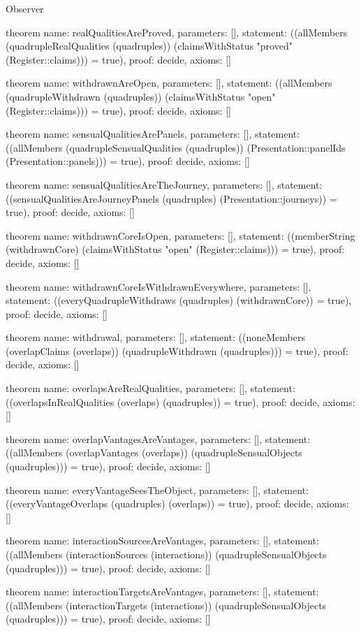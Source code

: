 \begin{lexlean}{Observer}
\begin{semanticmodule}
theorem{
  name: realQualitiesAreProved,
  parameters: [],
  statement: ((allMembers (quadrupleRealQualities (quadruples)) (claimsWithStatus "proved" (Register::claims))) = true),
  proof: decide{},
  axioms: []
}

theorem{
  name: withdrawnAreOpen,
  parameters: [],
  statement: ((allMembers (quadrupleWithdrawn (quadruples)) (claimsWithStatus "open" (Register::claims))) = true),
  proof: decide{},
  axioms: []
}

theorem{
  name: sensualQualitiesArePanels,
  parameters: [],
  statement: ((allMembers (quadrupleSensualQualities (quadruples)) (Presentation::panelIds (Presentation::panels))) = true),
  proof: decide{},
  axioms: []
}

theorem{
  name: sensualQualitiesAreTheJourney,
  parameters: [],
  statement: ((sensualQualitiesAreJourneyPanels (quadruples) (Presentation::journeys)) = true),
  proof: decide{},
  axioms: []
}

theorem{
  name: withdrawnCoreIsOpen,
  parameters: [],
  statement: ((memberString (withdrawnCore) (claimsWithStatus "open" (Register::claims))) = true),
  proof: decide{},
  axioms: []
}

theorem{
  name: withdrawnCoreIsWithdrawnEverywhere,
  parameters: [],
  statement: ((everyQuadrupleWithdraws (quadruples) (withdrawnCore)) = true),
  proof: decide{},
  axioms: []
}

theorem{
  name: withdrawal,
  parameters: [],
  statement: ((noneMembers (overlapClaims (overlaps)) (quadrupleWithdrawn (quadruples))) = true),
  proof: decide{},
  axioms: []
}

theorem{
  name: overlapsAreRealQualities,
  parameters: [],
  statement: ((overlapsInRealQualities (overlaps) (quadruples)) = true),
  proof: decide{},
  axioms: []
}

theorem{
  name: overlapVantagesAreVantages,
  parameters: [],
  statement: ((allMembers (overlapVantages (overlaps)) (quadrupleSensualObjects (quadruples))) = true),
  proof: decide{},
  axioms: []
}

theorem{
  name: everyVantageSeesTheObject,
  parameters: [],
  statement: ((everyVantageOverlaps (quadruples) (overlaps)) = true),
  proof: decide{},
  axioms: []
}

theorem{
  name: interactionSourcesAreVantages,
  parameters: [],
  statement: ((allMembers (interactionSources (interactions)) (quadrupleSensualObjects (quadruples))) = true),
  proof: decide{},
  axioms: []
}

theorem{
  name: interactionTargetsAreVantages,
  parameters: [],
  statement: ((allMembers (interactionTargets (interactions)) (quadrupleSensualObjects (quadruples))) = true),
  proof: decide{},
  axioms: []
}


\end{semanticmodule}
\end{lexlean}
